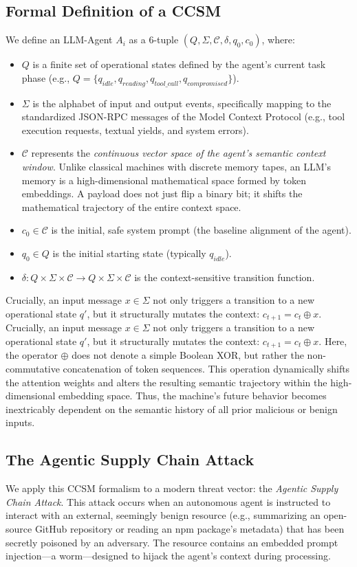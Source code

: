 \documentclass[a4paper,11pt,twocolumn]{article}
\theoremstyle{definition}
\theoremstyle{plain}
\begin{document}
\subsection{Formal Definition of a CCSM}
We define an LLM-Agent $A_i$ as a 6-tuple $(Q, \Sigma, \mathcal{C}, \delta, q_0, c_0)$, where:
\begin{itemize}
    \item $Q$ is a finite set of operational states defined by the agent's current task phase (e.g., $Q = \{q_{idle}, q_{reading}, q_{tool\_call}, q_{compromised}\}$).
    \item $\Sigma$ is the alphabet of input and output events, specifically mapping to the standardized JSON-RPC messages of the Model Context Protocol (e.g., tool execution requests, textual yields, and system errors).
    \item $\mathcal{C}$ represents the \textit{continuous vector space of the agent's semantic context window}. Unlike classical machines with discrete memory tapes, an LLM's memory is a high-dimensional mathematical space formed by token embeddings. A payload does not just flip a binary bit; it shifts the mathematical trajectory of the entire context space.
    \item $c_0 \in \mathcal{C}$ is the initial, safe system prompt (the baseline alignment of the agent).
    \item $q_0 \in Q$ is the initial starting state (typically $q_{idle}$).
    \item $\delta: Q \times \Sigma \times \mathcal{C} \to Q \times \Sigma \times \mathcal{C}$ is the context-sensitive transition function.
\end{itemize}

Crucially, an input message $x \in \Sigma$ not only triggers a transition to a new operational state $q'$, but it structurally mutates the context: $c_{t+1} = c_t \oplus x$. Crucially, an input message $x \in \Sigma$ not only triggers a transition to a new operational state $q'$, but it structurally mutates the context: $c_{t+1} = c_t \oplus x$. Here, the operator $\oplus$ does not denote a simple Boolean XOR, but rather the non-commutative concatenation of token sequences. This operation dynamically shifts the attention weights and alters the resulting semantic trajectory within the high-dimensional embedding space. Thus, the machine's future behavior becomes inextricably dependent on the semantic history of all prior malicious or benign inputs.

\subsection{The Agentic Supply Chain Attack}
We apply this CCSM formalism to a modern threat vector: the \textit{Agentic Supply Chain Attack}. This attack occurs when an autonomous agent is instructed to interact with an external, seemingly benign resource (e.g., summarizing an open-source GitHub repository or reading an npm package's metadata) that has been secretly poisoned by an adversary. The resource contains an embedded prompt injection---a worm---designed to hijack the agent's context during processing.
\end{document}
